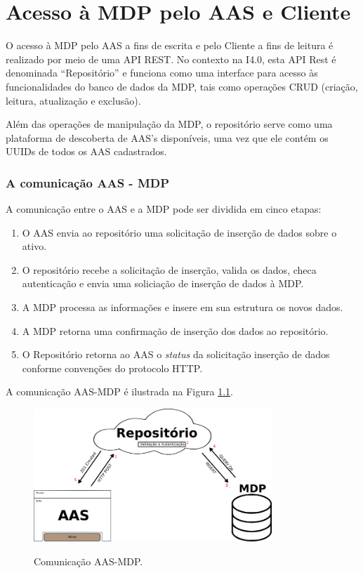 \documentclass[
	12pt,				%
	oneside,			%
	a4paper,			%
	english,			%
	brazil				%
]{abntex2}
\begin{document}
	
	
\chapter{Acesso à MDP pelo AAS e Cliente}
	\label{comunicacao-CS}
	
	O acesso à MDP pelo AAS a fins de escrita e pelo Cliente a fins de leitura é realizado por meio de uma API REST. No contexto na I4.0, esta API Rest é denominada ``Repositório'' e funciona como uma interface para acesso às funcionalidades do banco de dados da MDP, tais como operações CRUD (criação, leitura, atualização e exclusão).
	
	Além das operações de manipulação da MDP, o repositório serve como uma plataforma de descoberta de AAS's disponíveis, uma vez que ele contém os UUIDs de todos os AAS cadastrados.
	
	
	\subsection{A comunicação AAS - MDP}
	
	A comunicação entre o AAS e a MDP pode ser dividida em cinco etapas:
	
	\begin{enumerate}
		\item O AAS envia ao repositório uma solicitação de inserção de dados sobre o ativo.
		\item O repositório recebe a solicitação de inserção, valida os dados, checa autenticação e envia uma soliciação de inserção de dados à MDP.
		\item A MDP processa as informações e insere em sua estrutura os novos dados.
		\item A MDP retorna uma confirmação de inserção dos dados ao repositório.
		\item O Repositório retorna ao AAS o \textit{status} da solicitação inserção de dados conforme convenções do protocolo HTTP.
	\end{enumerate}
	
	
	A comunicação AAS-MDP é ilustrada na Figura \ref{fig:aas-mdp}.
	
	
	\begin{figure}[H]
		\centering
		\caption{Comunicação AAS-MDP.}
		\includegraphics[width=0.8\textwidth]{aas-mdp.png}
		\label{fig:aas-mdp}
	\end{figure}
\end{document}
